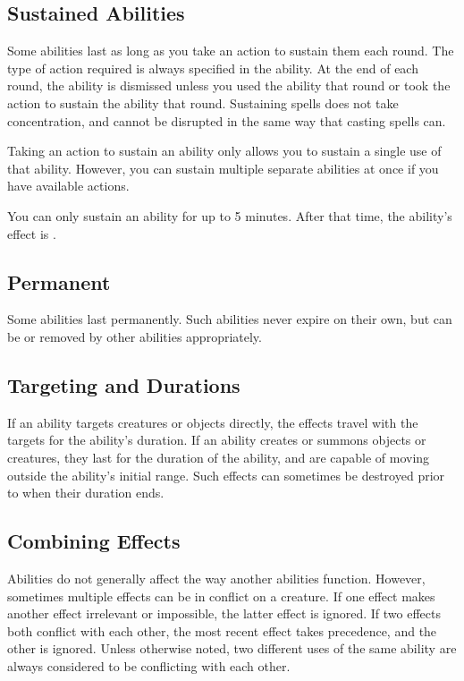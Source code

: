         \subsection{Sustained Abilities}\label{Sustained Abilities}
            Some abilities last as long as you take an action to sustain them each round.
            The type of action required is always specified in the ability.
            At the end of each round, the ability is dismissed unless you used the ability that round or took the action to sustain the ability that round.
            Sustaining spells does not take concentration, and cannot be disrupted in the same way that casting spells can.

            Taking an action to sustain an ability only allows you to sustain a single use of that ability.
            However, you can sustain multiple separate abilities at once if you have available actions.

            You can only sustain an ability for up to 5 minutes.
            After that time, the ability's effect is .

        \subsection{Permanent}
            Some abilities last permanently.
            Such abilities never expire on their own, but can be  or removed by other abilities appropriately.

        \subsection{Targeting and Durations}
            If an ability targets creatures or objects directly, the effects travel with the targets for the ability's duration.
            If an ability creates or summons objects or creatures, they last for the duration of the ability, and are capable of moving outside the ability's initial range.
            Such effects can sometimes be destroyed prior to when their duration ends.

    \subsection{Combining Effects}
        Abilities do not generally affect the way another abilities function.
        However, sometimes multiple effects can be in conflict on a creature.
        If one effect makes another effect irrelevant or impossible, the latter effect is ignored.
        If two effects both conflict with each other, the most recent effect takes precedence, and the other is ignored.
        Unless otherwise noted, two different uses of the same ability are always considered to be conflicting with each other.

